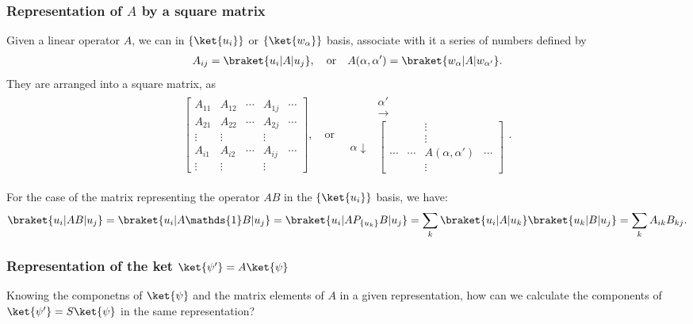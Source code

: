 \subsubsection{Representation of $A$ by a square matrix}
Given a linear operator $A$, we can in $\{\ket{u_i}\}$ or $\{\ket{w_\alpha}\}$ basis, associate with it a series of numbers defined by
\begin{align}
    A_{ij}=\braket{u_i|A|u_j},\quad\text{or}\quad A(\alpha,\alpha')=\braket{w_\alpha|A|w_{\alpha'}}.
\end{align}
They are arranged into a square matrix, as 
\begin{align}
    \begin{bmatrix}
        A_{11}&A_{12}&\cdots&A_{1j}&\cdots\\
        A_{21}&A_{22}&\cdots&A_{2j}&\cdots\\
        \vdots&\vdots&&\vdots&\\
        A_{i1}&A_{i2}&\cdots&A_{ij}&\cdots\\
        \vdots&\vdots&&\vdots&
    \end{bmatrix},\quad\text{or}\quad
    \begin{array}{cc}
        &\alpha'\\
        &\longrightarrow\\
        \alpha\downarrow&\begin{bmatrix}
            &&\vdots&\\
            &&\vdots&\\
            \cdots&\cdots&A(\alpha,\alpha')&\cdots\\
            &&\vdots&
        \end{bmatrix}
    \end{array}.
\end{align}

For the case of the matrix representing the operator $AB$ in the $\{\ket{u_i}\}$ basis, we have:
\begin{align*}
    \braket{u_i|AB|u_j}=\braket{u_i|A\mathds{1}B|u_j}=\braket{u_i|AP_{\{u_k\}}B|u_j}=\sum_k\braket{u_i|A|u_k}\braket{u_k|B|u_j}=\sum_kA_{ik}B_{kj}.
\end{align*}

\subsubsection{Representation of the ket $\ket{\psi'}=A\ket{\psi}$}
Knowing the componetns of $\ket{\psi}$ and the matrix elements of $A$ in a given representation, how can we calculate the components of $\ket{\psi'}=S\ket{\psi}$ in the 
same representation?

